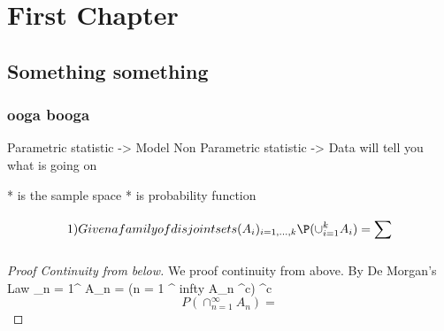 \chapter{First Chapter}
\section{Something something}

\subsection{ooga booga}


Parametric statistic -> Model
Non Parametric statistic -> Data will tell you what is going on 


\begin{list}
  * \omega is the sample space 
  *  is probability function
\end{list}


\begin{block}
  \begin{lemma}
    \[
      1) Given a family of disjoint sets (A_i)_{i = 1,...,k}
      \P(\cup_{i = 1}^kA_i ) = \sum_{}^{}

    \]
  \end{lemma}
   
\end{block}



\begin{proof}[Proof Continuity from below]
 We proof continuity from above. By De Morgan's Law
 \bigcap_{n = 1}^ \infty A_n = (\cup n = 1 ^ infty A_n ^{c}) ^{c}
 \[
  P(\cap_{n = 1}^\infty A_n) = 

 \]
\end{proof}
